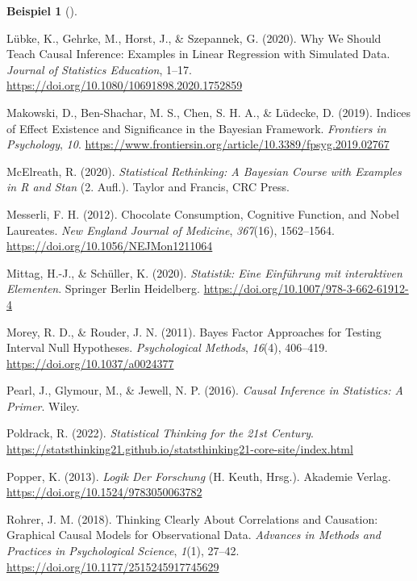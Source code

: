 \documentclass[
  ngerman,
  letterpaper,
  twoside,
  open=any]{scrbook}
\newlength{\cslhangindent}
\newenvironment{CSLReferences}[2] %
 {\begin{list}{}{%
  \setlength{\itemindent}{0pt}
  \setlength{\leftmargin}{0pt}
  \setlength{\parsep}{0pt}
  \ifodd #1
   \setlength{\leftmargin}{\cslhangindent}
   \setlength{\itemindent}{-1\cslhangindent}
  \fi
  \setlength{\itemsep}{#2\baselineskip}}}
 {\end{list}}
\theoremstyle{definition}
\newtheorem{example}{Beispiel}[chapter]
\theoremstyle{plain}
\theoremstyle{definition}
\theoremstyle{definition}
\theoremstyle{remark}
\begin{document}
\begin{example}[]
\begin{CSLReferences}{1}{0}
Lübke, K., Gehrke, M., Horst, J., \& Szepannek, G. (2020). Why {We
Should Teach Causal Inference}: {Examples} in {Linear Regression} with
{Simulated Data}. \emph{Journal of Statistics Education}, 1--17.
\url{https://doi.org/10.1080/10691898.2020.1752859}

Makowski, D., Ben-Shachar, M. S., Chen, S. H. A., \& Lüdecke, D. (2019).
Indices of {Effect Existence} and {Significance} in the {Bayesian
Framework}. \emph{Frontiers in Psychology}, \emph{10}.
\url{https://www.frontiersin.org/article/10.3389/fpsyg.2019.02767}

McElreath, R. (2020). \emph{Statistical Rethinking: A {Bayesian} Course
with Examples in {R} and {Stan}} (2. Aufl.). {Taylor and Francis, CRC
Press}.

Messerli, F. H. (2012). Chocolate {Consumption}, {Cognitive Function},
and {Nobel Laureates}. \emph{New England Journal of Medicine},
\emph{367}(16), 1562--1564. \url{https://doi.org/10.1056/NEJMon1211064}

Mittag, H.-J., \& Schüller, K. (2020). \emph{Statistik: Eine Einführung
mit interaktiven Elementen}. Springer Berlin Heidelberg.
\url{https://doi.org/10.1007/978-3-662-61912-4}

Morey, R. D., \& Rouder, J. N. (2011). Bayes Factor Approaches for
Testing Interval Null Hypotheses. \emph{Psychological Methods},
\emph{16}(4), 406--419. \url{https://doi.org/10.1037/a0024377}

Pearl, J., Glymour, M., \& Jewell, N. P. (2016). \emph{Causal Inference
in Statistics: A Primer}. Wiley.

Poldrack, R. (2022). \emph{Statistical {Thinking} for the 21st
{Century}}.
\url{https://statsthinking21.github.io/statsthinking21-core-site/index.html}

Popper, K. (2013). \emph{Logik Der {Forschung}} (H. Keuth, Hrsg.).
Akademie Verlag. \url{https://doi.org/10.1524/9783050063782}

Rohrer, J. M. (2018). Thinking {Clearly About Correlations} and
{Causation}: {Graphical Causal Models} for {Observational Data}.
\emph{Advances in Methods and Practices in Psychological Science},
\emph{1}(1), 27--42. \url{https://doi.org/10.1177/2515245917745629}


\end{CSLReferences}
\end{example}
\end{document}
